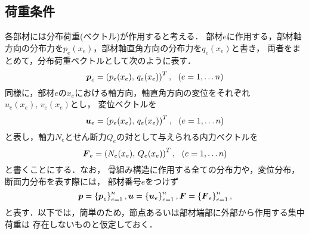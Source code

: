 \documentclass[10pt,a4j]{jarticle}
\begin{document}
\subsection{荷重条件}
各部材には分布荷重(ベクトル)が作用すると考える．
部材$e$に作用する，部材軸方向の分布力を$p_e(x_e)$，部材軸直角方向の分布力を$q_e(x_e)$と書き，
両者をまとめて，分布荷重ベクトルとして次のように表す．
\begin{equation}
	\mbox{\boldmath $p$}_e=\left( p_e(x_e),\, q_e(x_e) \right)^T, \ \ (e=1,\dots n)
	\label{eqn:}
\end{equation}
同様に，部材$e$の$x_e$における軸方向，軸直角方向の変位をそれぞれ$u_e(x_e),\, v_e(x_e)$とし，
変位ベクトルを
\begin{equation}
	\mbox{\boldmath $u$}_e=\left( p_e(x_e),\, q_e(x_e) \right)^T,  \ \ (e=1,\dots n)
	\label{eqn:}
\end{equation}
と表し，軸力$N_e$とせん断力$Q_e$の対として与えられる内力ベクトルを
\begin{equation}
	\mbox{\boldmath $F$}_e=\left( N_e(x_e),\, Q_e(x_e) \right)^T,  \ \ (e=1,\dots n)
	\label{eqn:}
\end{equation}
と書くことにする．なお，
骨組み構造に作用する全ての分布力や，変位分布，断面力分布を表す際には，
部材番号$e$をつけず
\begin{equation}
	\mbox{\boldmath $p$}=\left\{ \mbox{\boldmath $p$}_e \right\}_{e=1}^n, 
	\\
	\mbox{\boldmath $u$}=\left\{ \mbox{\boldmath $u$}_e \right\}_{e=1}^n, 
	\\
	\mbox{\boldmath $F$}=\left\{ \mbox{\boldmath $F$}_e \right\}_{e=1}^n,
	\label{eqn:}
\end{equation}
と表す．以下では，簡単のため，節点あるいは部材端部に外部から作用する集中荷重は
存在しないものと仮定しておく．
\end{document}
